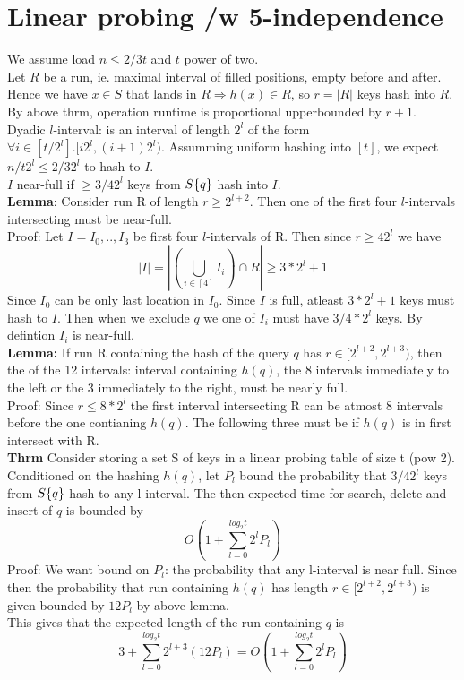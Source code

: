 \documentclass[a4paper]{article}
\begin{document}
\section{Linear probing /w 5-independence}
We assume load \(n \leq 2/3 t\) and \(t\) power of two.\\
Let \(R\) be a run, ie. maximal interval of filled positions, empty before and after. Hence we have \(x\in S\) that lands in \(R \Rightarrow h(x) \in R\), so \(r=|R|\) keys hash into \(R\).\\
By above thrm, operation runtime is proportional upperbounded by \(r+1\).\\
Dyadic \(l\)-interval: is an interval of length \(2^l\) of the form \(\forall i\in [t/2^l].[i2^l,(i+1)2^l)\). Assumming uniform hashing into \([t]\), we expect \(n/t2^l \leq 2/3 2^l\) to hash to \(I\).\\
\(I\) near-full if \(\geq 3/4 2^l\) keys from \(S\\\{q\}\) hash into \(I\).\\
\textbf{Lemma}: Consider run R of length \(r \geq 2^{l+2}\). Then one of the first four \(l\)-intervals intersecting must be near-full.\\
Proof: Let \(I = I_0,..,I_3\) be first four \(l\)-intervals of R. Then since \(r \geq 4 2^l\) we have 
\[|I| = |\left(\bigcup_{i\in [4]} I_i\right) \cap R| \geq 3*2^l +1\] 
Since \(I_0\) can be only last location in \(I_0\). Since \(I\) is full, atleast \(3*2^l +1\) keys must hash to \(I\). Then when we exclude \(q\) we one of \(I_i\) must have \(3/4*2^l\) keys. By defintion \(I_i\) is near-full.\\
\textbf{Lemma:} If run R containing the hash of the query \(q\) has \(r \in [2^{l+2},2^{l+3})\), then the of the 12 intervals: interval containing \(h(q)\), the 8 intervals immediately to the left or the 3 immediately to the right, must be nearly full.\\
Proof: Since \(r\leq 8*2^l\) the first interval intersecting R can be atmost 8 intervals before the one contianing \(h(q)\). The following three must be if \(h(q)\) is in first intersect with R.\\
\textbf{Thrm} Consider storing a set S of keys in a linear probing table of size t (pow 2). Conditioned on the hashing \(h(q)\), let \(P_l\) bound the probability that \(3/4 2^l\) keys from \(S\\\{q\}\) hash to any l-interval. The then expected time for search, delete and insert of \(q\) is bounded by 
\[O \left(1+\sum_{l=0}^{log_2 t} 2^{l}P_l\right)\]
Proof: We want bound on \(P_l\): the probability that any l-interval is near full. Since then the probability that run containing \(h(q)\) has length \(r\in [2^{l+2},2^{l+3})\) is given bounded by \(12P_l\) by above lemma.\\
This gives that the expected length of the run  containing \(q\) is
\[3+\sum_{l=0}^{log_2 t} 2^{l+3}(12P_l) = O \left(1+\sum_{l=0}^{log_2 t} 2^{l}P_l\right)\]
\end{document}
